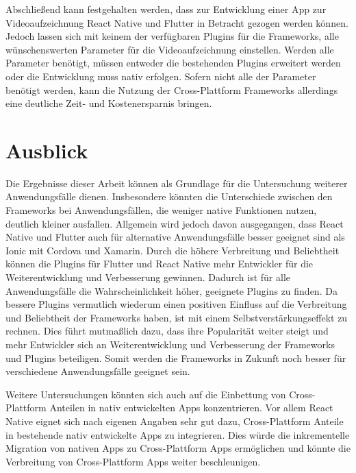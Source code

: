 Abschließend kann festgehalten werden, dass zur Entwicklung einer App zur Videoaufzeichnung React Native und Flutter in Betracht gezogen werden können.
Jedoch lassen sich mit keinem der verfügbaren Plugins für die Frameworks, alle wünschenswerten Parameter für die Videoaufzeichnung einstellen.
Werden alle Parameter benötigt, müssen entweder die bestehenden Plugins erweitert werden oder die Entwicklung muss nativ erfolgen.
Sofern nicht alle der Parameter benötigt werden, kann die Nutzung der Cross-Plattform Frameworks allerdings eine deutliche Zeit- und Kostenersparnis bringen.


\section{Ausblick}

Die Ergebnisse dieser Arbeit können als Grundlage für die Untersuchung weiterer Anwendungsfälle dienen.
Insbesondere könnten die Unterschiede zwischen den Frameworks bei Anwendungsfällen, die weniger native Funktionen nutzen, deutlich kleiner ausfallen.
Allgemein wird jedoch davon ausgegangen, dass React Native und Flutter auch für alternative Anwendungsfälle besser geeignet sind als Ionic mit Cordova und Xamarin.
Durch die höhere Verbreitung und Beliebtheit können die Plugins für Flutter und React Native mehr Entwickler für die Weiterentwicklung und Verbesserung gewinnen.
Dadurch ist für alle Anwendungsfälle die Wahrscheinlichkeit höher, geeignete Plugins zu finden.
Da bessere Plugins vermutlich wiederum einen positiven Einfluss auf die Verbreitung und Beliebtheit der Frameworks haben, ist mit einem Selbstverstärkungseffekt zu rechnen.
Dies führt mutmaßlich dazu, dass ihre Popularität weiter steigt und mehr Entwickler sich an Weiterentwicklung und Verbesserung der Frameworks und Plugins beteiligen.
Somit werden die Frameworks in Zukunft noch besser für verschiedene Anwendungsfälle geeignet sein.

Weitere Untersuchungen könnten sich auch auf die Einbettung von Cross-Plattform Anteilen in nativ entwickelten Apps konzentrieren.
Vor allem React Native eignet sich nach eigenen Angaben sehr gut dazu, Cross-Plattform Anteile in bestehende nativ entwickelte Apps zu integrieren.
Dies würde die inkrementelle Migration von nativen Apps zu Cross-Plattform Apps ermöglichen und könnte die Verbreitung von Cross-Plattform Apps weiter beschleunigen.